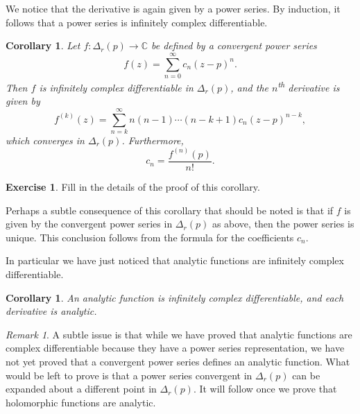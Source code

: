\documentclass[12pt,openany]{book}
\newcommand{\C}{{\mathbb{C}}}
\theoremstyle{plain}
\newtheorem{cor}[thm]{Corollary}
\theoremstyle{remark}
\newtheorem{remark}[thm]{Remark}
\theoremstyle{definition}
\newenvironment{exbox}{%
    \def\FrameCommand{\vrule width 1pt \relax\hspace {10pt}}%
    \MakeFramed {\advance \hsize -\width \FrameRestore }%
}{%
    \endMakeFramed
}
\theoremstyle{exercise}
\newtheorem{exercise}{Exercise}[section]
\theoremstyle{example}
\begin{document}
We notice that the derivative is again given by a power series.
By induction, it follows that a power series is infinitely complex
differentiable.

\begin{cor} \label{cor:convpowserinfdif}
Let $f \colon \Delta_r(p) \to \C$ be defined by a convergent power series
\begin{equation*}
f(z) = \sum_{n=0}^\infty c_n {(z-p)}^n .
\end{equation*}
Then $f$ is infinitely complex differentiable in $\Delta_r(p)$,
and the $n$\textsuperscript{th} derivative is given by
\begin{equation*}
f^{(k)}(z) = \sum_{n=k}^\infty n(n-1)\cdots(n-k+1) c_n {(z-p)}^{n-k} ,
\end{equation*}
which converges in $\Delta_r(p)$.
Furthermore,
\begin{equation*}
c_n =
\frac{f^{(n)}(p)}{n!} .
\end{equation*}
\end{cor}

\begin{exbox}
\begin{exercise}
Fill in the details of the proof of this corollary.
\end{exercise}
\end{exbox}

Perhaps a subtle consequence of
this corollary that should be
noted is that if $f$ is given by the convergent power series in
$\Delta_r(p)$ as above, then the power series is unique.  This conclusion
follows from the formula for the coefficients $c_n$.

In particular we have just noticed that
analytic functions are infinitely complex differentiable.

\begin{cor} \label{cor:analinfdif}
An analytic function is infinitely complex differentiable, and each
derivative is analytic.
\end{cor}

\begin{remark}
A subtle issue is that while we have proved that analytic functions are
complex differentiable because they have a power series representation,
we have not yet proved that a convergent power series defines an analytic
function.  What would be left to prove is that a power series convergent
in $\Delta_r(p)$ can be
expanded about a different point in $\Delta_r(p)$.  It will follow
once we prove that holomorphic functions are analytic.
\end{remark}
\end{document}
